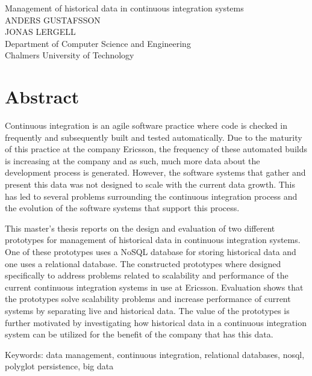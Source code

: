 Management of historical data in continuous integration systems\\
ANDERS GUSTAFSSON\\
JONAS LERGELL\\
Department of Computer Science and Engineering\\
Chalmers University of Technology\\

\thispagestyle{plain}			%
\section*{Abstract}
Continuous integration is an agile software practice where code is checked in frequently and subsequently built and tested automatically. Due to the maturity of this practice at the company Ericsson, the frequency of these automated builds is increasing at the company and as such, much more data about the development process is generated. However, the software systems that gather and present this data was not designed to scale with the current data growth. This has led to several problems surrounding the continuous integration process and the evolution of the software systems that support this process.

This master's thesis reports on the design and evaluation of two different prototypes for management of historical data in continuous integration systems. One of these prototypes uses a NoSQL database for storing historical data and one uses a relational database. The constructed prototypes where designed specifically to address problems related to scalability and performance of the current continuous integration systems in use at Ericsson. Evaluation shows that the prototypes solve scalability problems and increase performance of current systems by separating live and historical data. The value of the prototypes is further motivated by investigating how historical data in a continuous integration system can be utilized for the benefit of the company that has this data.





\vfill
Keywords: data management, continuous integration, relational databases, nosql, polyglot persistence, big data

\newpage				%
\thispagestyle{empty}
\mbox{}